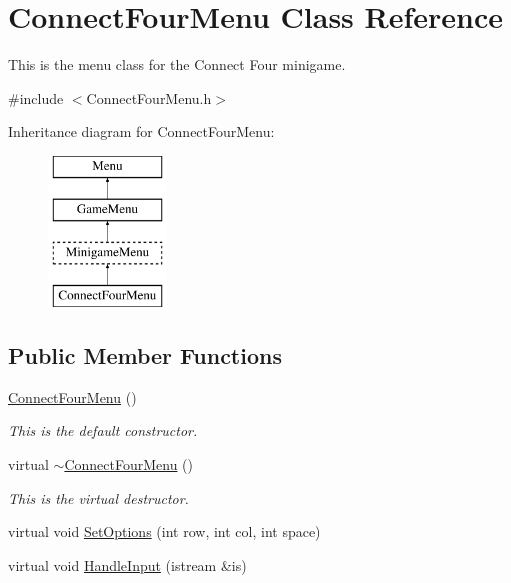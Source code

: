 \hypertarget{classConnectFourMenu}{\section{Connect\-Four\-Menu Class Reference}
\label{classConnectFourMenu}
}


This is the menu class for the Connect Four minigame.  




{\ttfamily \#include $<$Connect\-Four\-Menu.\-h$>$}

Inheritance diagram for Connect\-Four\-Menu\-:\begin{figure}[H]
\begin{center}
\leavevmode
\includegraphics[height=4.000000cm]{classConnectFourMenu}
\end{center}
\end{figure}
\subsection*{Public Member Functions}
\begin{DoxyCompactItemize}
\item 
\hyperlink{classConnectFourMenu_a368513cbf367d7014e664667dbbb94ae}{Connect\-Four\-Menu} ()
\begin{DoxyCompactList}\small\item\em This is the default constructor. \end{DoxyCompactList}\item 
virtual \hyperlink{classConnectFourMenu_a53789934922dbbd5bfa5be90e69dfcb4}{$\sim$\-Connect\-Four\-Menu} ()
\begin{DoxyCompactList}\small\item\em This is the virtual destructor. \end{DoxyCompactList}\item 
virtual void \hyperlink{classConnectFourMenu_a6a826d0810795584cfb4b601d5cd5df2}{Set\-Options} (int row, int col, int space)
\item 
virtual void \hyperlink{classConnectFourMenu_a2af0c62dd776dd0e3d8c212f71eb3219}{Handle\-Input} (istream \&is)
\end{DoxyCompactItemize}
